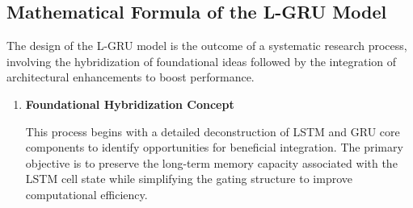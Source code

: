 \documentclass{cys}
\begin{document}
\subsection{Mathematical Formula of the L-GRU Model}
The design of the L-GRU model is the outcome of a systematic research process, involving the hybridization of foundational ideas followed by the integration of architectural enhancements to boost performance.

\begin{enumerate}
  \item \textbf{Foundational Hybridization Concept}

  This process begins with a detailed deconstruction of LSTM and GRU core components to identify opportunities for beneficial integration. The primary objective is to preserve the long-term memory capacity associated with the LSTM cell state while simplifying the gating structure to improve computational efficiency.
\end{enumerate}
\end{document}
